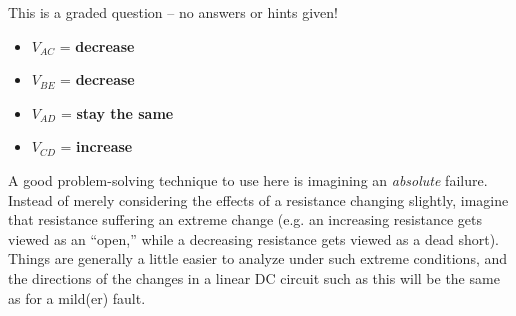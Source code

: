 
This is a graded question -- no answers or hints given!







\begin{itemize}
\item{} $V_{AC}$ = {\bf decrease}
\vskip 10pt
\item{} $V_{BE}$ = {\bf decrease}
\vskip 10pt
\item{} $V_{AD}$ = {\bf stay the same}
\vskip 10pt
\item{} $V_{CD}$ = {\bf increase}
\end{itemize}

A good problem-solving technique to use here is imagining an {\it absolute} failure.  Instead of merely considering the effects of a resistance changing slightly, imagine that resistance suffering an extreme change (e.g. an increasing resistance gets viewed as an ``open,'' while a decreasing resistance gets viewed as a dead short).  Things are generally a little easier to analyze under such extreme conditions, and the directions of the changes in a linear DC circuit such as this will be the same as for a mild(er) fault.




